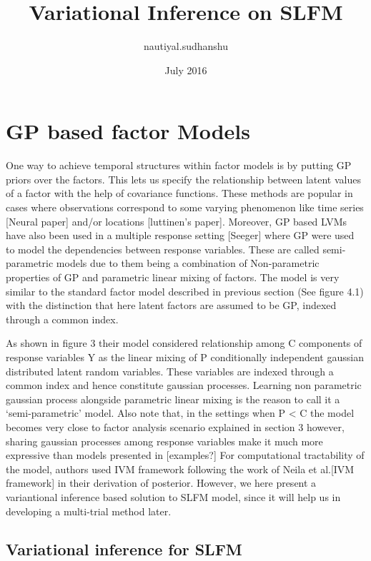 \documentclass{article}
\title{Variational Inference on SLFM}
\author{nautiyal.sudhanshu }
\date{July 2016}
\begin{document}
\maketitle

\section{GP based factor Models}

One way to achieve temporal structures within factor models is by putting GP priors over the factors. This lets us specify the relationship between latent values of a factor with the help of covariance functions. These methods are popular in cases where observations correspond to some varying phenomenon like time series [Neural paper] and/or locations [luttinen’s paper]. Moreover, GP based LVMs have also been used in a multiple response setting [Seeger] where GP were used to model the dependencies between response variables. These are called semi-parametric models due to them being a combination of Non-parametric properties of GP and parametric linear mixing of factors. 
The model is very similar to the standard factor model described in previous section (See figure 4.1) with the distinction that here latent factors are assumed to be GP, indexed through a common index. 

As shown in figure 3 their model considered relationship among C components of response variables Y as the linear mixing of P conditionally independent gaussian distributed latent random variables. These variables are indexed through a common index and hence constitute gaussian processes. Learning non parametric gaussian process alongside parametric linear mixing is the reason to call it a ‘semi-parametric’ model. Also note that, in the settings when P < C the model becomes very close to factor analysis scenario explained in section 3 however, sharing gaussian processes among response variables make it much more expressive than models presented in [examples?]  
For computational tractability of the model, authors used IVM framework following the work of Neila et al.[IVM framework]  in their derivation of posterior. However, we here present a variantional inference based solution to SLFM model, since it will help us in developing a multi-trial method later. 

\subsection{Variational inference for SLFM}
\end{document}
